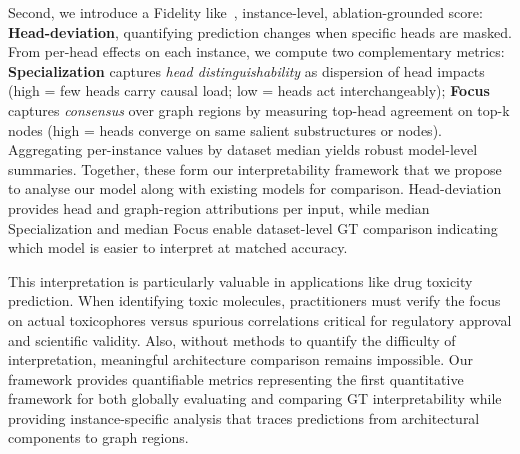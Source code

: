 \documentclass[lettersize,journal]{IEEEtran}
\begin{document}
Second, we introduce a Fidelity like~\cite{lukyanov_robustness_2025,amara_graphframex_2024}, instance-level, ablation-grounded score: \textbf{Head-deviation}, quantifying prediction changes when specific heads are masked. From per-head effects on each instance, we compute two complementary metrics: \textbf{Specialization} captures \textit{head distinguishability} as dispersion of head impacts (high = few heads carry causal load; low = heads act interchangeably); \textbf{Focus} captures \textit{consensus} over graph regions by measuring top-head agreement on top-k nodes (high = heads converge on same salient substructures or nodes). Aggregating per-instance values by dataset median yields robust model-level summaries. Together, these form our interpretability framework that we propose to analyse our model along with existing models for comparison. Head-deviation provides head and graph-region attributions per input, while median Specialization and median Focus enable dataset-level GT comparison indicating which model is easier to interpret at matched accuracy.

This interpretation is particularly valuable in applications like drug toxicity prediction. When identifying toxic molecules, practitioners must verify the focus on actual toxicophores versus spurious correlations critical for regulatory approval and scientific validity. Also, without methods to quantify the difficulty of interpretation, meaningful architecture comparison remains impossible. Our framework provides quantifiable metrics representing the first quantitative framework for both globally evaluating and comparing GT interpretability while providing instance-specific analysis that traces predictions from architectural components to graph regions.
\end{document}
